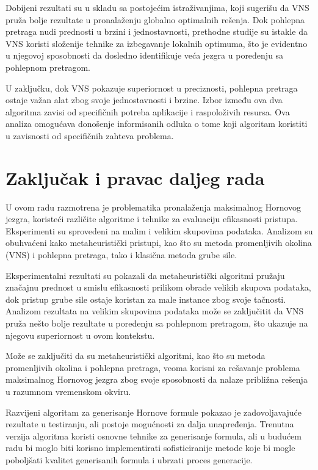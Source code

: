 \documentclass[12pt,oneside]{memoir}
\begin{document}
Dobijeni rezultati su u skladu sa postojećim istraživanjima, koji sugerišu da VNS pruža bolje rezultate u pronalaženju globalno optimalnih rešenja. Dok pohlepna pretraga nudi prednosti u brzini i jednostavnosti, prethodne studije su istakle da VNS koristi složenije tehnike za izbegavanje lokalnih optimuma, što je evidentno u njegovoj sposobnosti da dosledno identifikuje veća jezgra u poređenju sa pohlepnom pretragom.

U zaključku, dok VNS pokazuje superiornost u preciznosti, pohlepna pretraga ostaje važan alat zbog svoje jednostavnosti i brzine. Izbor između ova dva algoritma zavisi od specifičnih potreba aplikacije i raspoloživih resursa. Ova analiza omogućava donošenje informisanih odluka o tome koji algoritam koristiti u zavisnosti od specifičnih zahteva problema.

\chapter{Zaključak i pravac daljeg rada}

U ovom radu razmotrena je problematika pronalaženja maksimalnog Hornovog jezgra, koristeći različite algoritme i tehnike za evaluaciju efikasnosti pristupa. Eksperimenti su sprovedeni na malim i velikim skupovima podataka. Analizom su obuhvaćeni kako metaheuristički pristupi, kao što su metoda promenljivih okolina (VNS) i pohlepna pretraga, tako i klasična metoda grube sile. 

Eksperimentalni rezultati su pokazali da metaheuristički algoritmi pružaju značajnu prednost u smislu efikasnosti prilikom obrade velikih skupova podataka, dok pristup grube sile ostaje koristan za male instance zbog svoje tačnosti.
Analizom rezultata na velikim skupovima podataka može se zaključitit da VNS pruža nešto bolje rezultate u poređenju sa pohlepnom pretragom, što ukazuje na njegovu superiornost u ovom kontekstu.

Može se zaključiti da su metaheuristički algoritmi, kao što su metoda promenljivih okolina i pohlepna pretraga, veoma korisni za rešavanje problema maksimalnog Hornovog jezgra zbog svoje sposobnosti da nalaze približna rešenja u razumnom vremenskom okviru.

Razvijeni algoritam za generisanje Hornove formule pokazao je zadovoljavajuće rezultate u testiranju, ali postoje mogućnosti za dalja unapređenja. Trenutna verzija algoritma koristi osnovne tehnike za generisanje formula, ali u budućem radu bi moglo biti korisno implementirati sofisticiranije metode koje bi mogle poboljšati kvalitet generisanih formula i ubrzati proces generacije.
\end{document}
